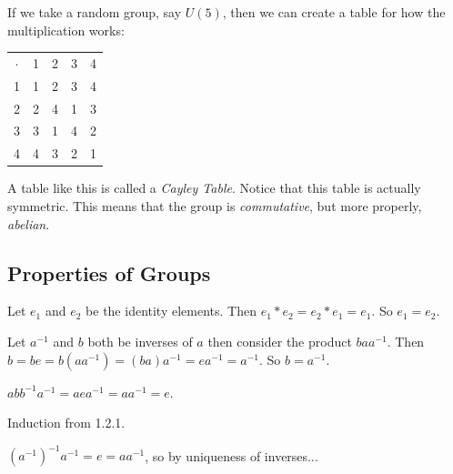 \documentclass{report}
\begin{document}
\noindent If we take a random group, say $U(5)$, then we can create a table for how the multiplication works:

\begin{center}
	\noindent\begin{tabular}{c | c c c c}
	$\cdot$ & 1 & 2 & 3 & 4  \\
	\cline{1-5}
	1 & 1 & 2 & 3 & 4 \\
	2 & 2 & 4 & 1 & 3  \\
	3 & 3 & 1 & 4 & 2 \\
	4 & 4 & 3 & 2 & 1 \\
	\end{tabular}
\end{center}

A table like this is called a \emph{Cayley Table}. Notice that this table is actually symmetric. This means that the group is \emph{commutative}, but more properly, \emph{abelian}.


\subsection{Properties of Groups}
\begin{myproof}
	Let $e_1$ and $e_2$ be the identity elements. Then $e_1*e_2 = e_2*e_1 = e_1$. So $e_1 = e_2$.
\end{myproof}

\begin{myproof}
	Let $a^{-1}$ and $b$ both be inverses of $a$ then consider the product $baa^{-1}$. Then $b = be = b(aa^{-1}) = (ba)a^{-1} = ea^{-1}= a^{-1}$. So $b = a^{-1}$.
\end{myproof}

\begin{myproof}
	$abb^{-1}a^{-1} = aea^{-1} = aa^{-1} = e$.
\end{myproof}

\begin{myproof}
	Induction from 1.2.1. 
\end{myproof}

\begin{myproof}
	$(a^{-1})^{-1}a^{-1} = e = aa^{-1}$, so by uniqueness of inverses...
\end{myproof}
\end{document}
